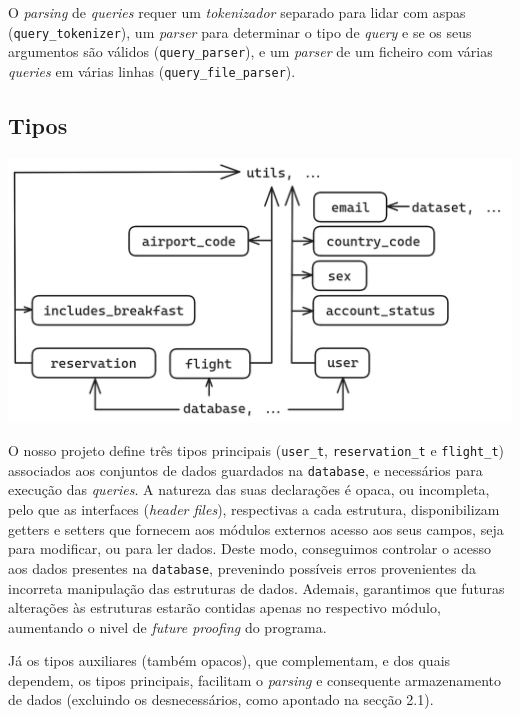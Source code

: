 \documentclass[12pt, a4paper]{article}
\begin{document}
O \emph{parsing} de \emph{queries} requer um \emph{tokenizador} separado para lidar com aspas
(\texttt{query\_tokenizer}), um \emph{parser} para determinar o tipo de \emph{query} e se os seus
argumentos são válidos (\texttt{query\_parser}), e um \emph{parser} de um ficheiro com várias
\emph{queries} em várias linhas (\texttt{query\_file\_parser}).

\subsection{Tipos}

\begin{center}
	\includegraphics[scale=0.3]{res/tipos.png}
\end{center}

O nosso projeto define três tipos principais (\texttt{user\_t}, \texttt{reservation\_t} e
\texttt{flight\_t}) associados aos conjuntos de dados guardados na \texttt{database}, e necessários
para execução das \emph{queries}. A natureza das suas declarações é opaca, ou incompleta, pelo que
as interfaces (\emph{header files}), respectivas a cada estrutura, disponibilizam getters e setters
que fornecem aos módulos externos acesso aos seus campos, seja para modificar, ou para ler dados.
Deste modo, conseguimos controlar o acesso aos dados presentes na \texttt{database}, prevenindo
possíveis erros provenientes da incorreta manipulação das estruturas de dados. Ademais, garantimos
que futuras alterações às estruturas estarão contidas apenas no respectivo módulo, aumentando o
nivel de \emph{future proofing} do programa.  

Já os tipos auxiliares (também opacos), que complementam, e dos quais dependem, os tipos principais,
facilitam o \emph{parsing} e consequente armazenamento de dados (excluindo os desnecessários, como
apontado na secção 2.1).
\end{document}
